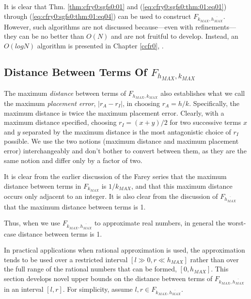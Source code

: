 \vworkexamplefooter{}

It is clear that Thm. \ref{thm:cfry0:sgfs0:01}
and (\ref{eq:cfry0:sgfs0:thm:01:eq01}) through
(\ref{eq:cfry0:sgfs0:thm:01:eq04}) can be used to construct
$F_{k_{MAX}, \overline{h_{MAX}}}$.  However, such algorithms
are not discussed because---even with refinements---they
can be no better than $O(N)$ and are not
fruitful to develop.  Instead, an $O(log N)$
algorithm is presented in 
Chapter \ref{ccfr0}, 
\emph{\ccfrzeroshorttitle{}}.


\subsection[Distance Between Terms Of $F_{h_{MAX},k_{MAX}}$]
           {Distance Between Terms Of \mbox{\boldmath $F_{h_{MAX},k_{MAX}}$}}

The maximum \emph{distance} between terms of $F_{h_{MAX},k_{MAX}}$ also establishes
what we call the maximum \emph{placement error}, $|r_A - r_I|$, in choosing
$r_A = h/k$.  Specifically, the maximum distance is twice the maximum placement
error.  Clearly, with a maximum distance specified, choosing $r_I = (x+y)/2$ for
two successive terms $x$ and $y$ separated by the maximum distance is 
the most antagonistic
choice of $r_I$ possible.
We use the two notions (maximum distance and maximum placement error)
interchangeably and don't bother to convert between them, as they are
the same notion and differ only by a factor of two.

It is clear from the earlier discussion of the Farey series that the maximum
distance between terms in $F_{k_{MAX}}$ is $1/k_{MAX}$, and that this maximum
distance occurs only adjacent to an integer.  It is also clear from the
discussion of $F_{\overline{h_{MAX}}}$ that the maximum distance between terms
is 1.

Thus, when we use $F_{k_{MAX}, \overline{h_{MAX}}}$ to approximate real numbers,
in general the worst-case distance between terms is 1.

In practical applications when rational approximation is used,
the approximation tends to be used over a restricted interval
$[l \gg  0, r \ll h_{MAX}]$ rather than over the full range of the rational numbers that
can be formed, $[0, h_{MAX}]$.  This section develops novel upper bounds on
the distance between terms of $F_{k_{MAX}, \overline{h_{MAX}}}$ in an interval
$[l,r]$.  For simplicity, assume $l,r \in F_{k_{MAX}, \overline{h_{MAX}}}$.

